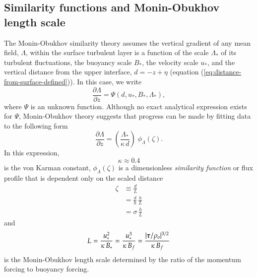 \subsection{Similarity functions and Monin-Obukhov length scale}
\label{subsection:m-o-similarity-functions}

The Monin-Obukhov similarity theory assumes the vertical gradient of
any mean field, $\Lambda$, within the surface turbulent layer is a
function of the scale $\Lambda_{*}$ of its turbulent fluctuations, the
buoyancy scale $B_{*}$, the velocity scale $u_{*}$, and the vertical
distance from the upper interface, $d=-z+\eta$ (equation
(\ref{eq:distance-from-surface-defined})). In this case, we write
\begin{equation}
 \frac{\partial \Lambda}{\partial z} =  \Psi(d, u_{*}, B_{*}, \Lambda_{*}), 
\end{equation}
where $\Psi$ is an unknown function.  Although no exact analytical
expression exists for $\Psi$, Monin-Obukhov theory suggests that
progress can be made by fitting data to the following
form
\begin{equation}
  \frac{\partial \Lambda}{\partial z} = \left( \frac{\Lambda_{*}}{\kappa \, d} \right) \; \phi_{\Lambda}(\zeta).
\label{eq:m-o-similarity-form}
\end{equation}
In this expression, 
\begin{equation}
 \kappa \approx 0.4 
\label{eq:von-karman-constant}
\end{equation}
is the von Karman constant, $\phi_{\Lambda}(\zeta)$ is a dimensionless
{\it similarity function} or flux profile that is dependent only on
the scaled distance
\begin{subequations}
\begin{align}
  \zeta &\equiv \frac{d}{L}
 \\
 &= \frac{d}{h} \, \frac{h}{L}
 \\
 &= \sigma \, \frac{h}{L} 
\label{eq:zeta-scaled-distance-defined}
\end{align}
\end{subequations}
 and 
\begin{equation}
  L = \frac{u_{*}^{2}}{\kappa \, B_{*}} = \frac{u_{*}^{3}}{\kappa \, B_{f}} 
  = \frac{ |\mbox{\boldmath $\tau$}/\rho_{o}|^{3/2}}{\kappa \, B_{f}}
\label{eq:m-o-length-scale}
\end{equation}
is the Monin-Obukhov length scale determined by the ratio of the
momentum forcing to buoyancy forcing.

